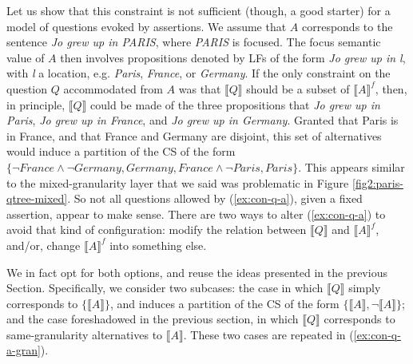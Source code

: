 Let us show that this constraint is not sufficient (though, a good starter) for a model of questions evoked by assertions. We assume that $A$ corresponds to the sentence \textit{Jo grew up in PARIS}, where \textit{PARIS} is focused. The focus semantic value of $A$ then involves propositions denoted by LFs of the form \textit{Jo grew up in l}, with \textit{l} a location, e.g. \textit{Paris}, \textit{France}, or \textit{Germany}. If the only constraint on the question $Q$ accommodated from $A$ was that $\llbracket Q \rrbracket$ should be a subset of  $\llbracket A\rrbracket^f$, then, in principle, $\llbracket Q \rrbracket$ could be made of the three propositions that \textit{Jo grew up in Paris}, \textit{Jo grew up in France}, and \textit{Jo grew up in Germany}. Granted that Paris is in France, and that France and Germany are disjoint, this set of alternatives would induce a partition of the CS of the form $\lbrace \neg \textit{France} \wedge \neg \textit{Germany}, \textit{Germany}, \textit{France} \wedge \neg \textit{Paris}, \textit{Paris}\rbrace$. This appears similar to the mixed-granularity layer that we said was problematic in Figure \ref{fig2:paris-qtree-mixed}. So not all questions allowed by (\ref{ex:con-q-a}), given a fixed assertion, appear to make sense. There are two ways to alter (\ref{ex:con-q-a}) to avoid that kind of configuration: modify the relation between $\llbracket Q\rrbracket$ and $\llbracket A \rrbracket^f$, and/or, change $\llbracket A \rrbracket^f$ into something else.

We in fact opt for both options, and reuse the ideas presented in the previous Section. Specifically, we consider two subcases: the case in which $\llbracket Q \rrbracket$ simply corresponds to $\lbrace \llbracket A \rrbracket \rbrace$, and induces a partition of the CS of the form $\lbrace \llbracket A \rrbracket, \neg\llbracket A \rrbracket \rbrace$; and the case foreshadowed in the previous section, in which $\llbracket Q \rrbracket$ corresponds to same-granularity alternatives to $\llbracket A \rrbracket$. These two cases are repeated in (\ref{ex:con-q-a-gran}).

\begin{exe}
	\label{ex:con-q-a-gran}
\end{exe}


